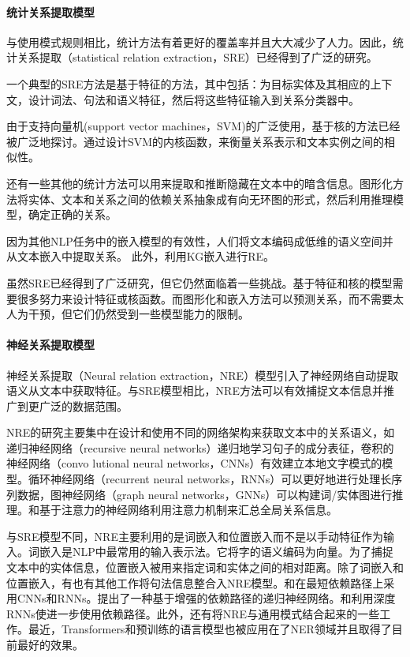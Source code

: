 \documentclass[UTF8,a4paper]{ctexart}
\begin{document}
\paragraph{统计关系提取模型}
与使用模式规则相比，统计方法有着更好的覆盖率并且大大减少了人力。因此，统计关系提取（statistical relation extraction，SRE）已经得到了广泛的研究。
\par
一个典型的SRE方法是基于特征的方法\cite{jiang-zhai-2007-systematic}，其中包括：为目标实体及其相应的上下文，设计词法、句法和语义特征，然后将这些特征输入到关系分类器中。
\par
由于支持向量机(support vector machines，SVM)\cite{wang-2008-examination}的广泛使用，基于核的方法已经被广泛地探讨。通过设计SVM的内核函数，来衡量关系表示和文本实例之间的相似性。
\par
还有一些其他的统计方法可以用来提取和推断隐藏在文本中的暗含信息。图形化方法\cite{yu-lam-2010-jointly}将实体、文本和关系之间的依赖关系抽象成有向无环图的形式，然后利用推理模型，确定正确的关系。
\par
因为其他NLP任务中的嵌入模型的有效性，人们将文本编码成低维的语义空间并从文本嵌入\cite{gormley-etal-2015-improved}中提取关系。 此外，利用KG嵌入进行RE。
\par
虽然SRE已经得到了广泛研究，但它仍然面临着一些挑战。基于特征和核的模型需要很多努力来设计特征或核函数。而图形化和嵌入方法可以预测关系，而不需要太人为干预，但它们仍然受到一些模型能力的限制。
\paragraph{神经关系提取模型}
神经关系提取（Neural relation extraction，NRE）模型引入了神经网络自动提取语义从文本中获取特征。与SRE模型相比，NRE方法可以有效捕捉文本信息并推广到更广泛的数据范围。
\par
NRE的研究主要集中在设计和使用不同的网络架构来获取文本中的关系语义，如递归神经网络（recursive neural networks）\cite{miwa-bansal-2016-end}递归地学习句子的成分表征，卷积的神经网络（convo  lutional neural networks，CNNs）\cite{2017arXiv170708866H}有效建立本地文字模式的模型。循环神经网络（recurrent neural networks，RNNs）\cite{vu-etal-2016-combining}可以更好地进行处理长序列数据，图神经网络（graph neural networks，GNNs）\cite{2019arXiv190906058Z}可以构建词/实体图进行推理。和基于注意力的神经网络利用注意力机制来汇总全局关系信息。
\par 
与SRE模型不同，NRE主要利用的是词嵌入和位置嵌入而不是以手动特征作为输入。词嵌入是NLP中最常用的输入表示法。它将字的语义编码为向量。为了捕捉文本中的实体信息，位置嵌入被用来指定词和实体之间的相对距离。除了词嵌入和位置嵌入，有也有其他工作将句法信息整合入NRE模型。和在最短依赖路径上采用CNNs和RNNs。提出了一种基于增强的依赖路径的递归神经网络。和利用深度RNNs使进一步使用依赖路径。此外，还有将NRE与通用模式结合起来的一些工作。最近，Transformers和预训练的语言模型也被应用在了NER领域并且取得了目前最好的效果。
\end{document}
